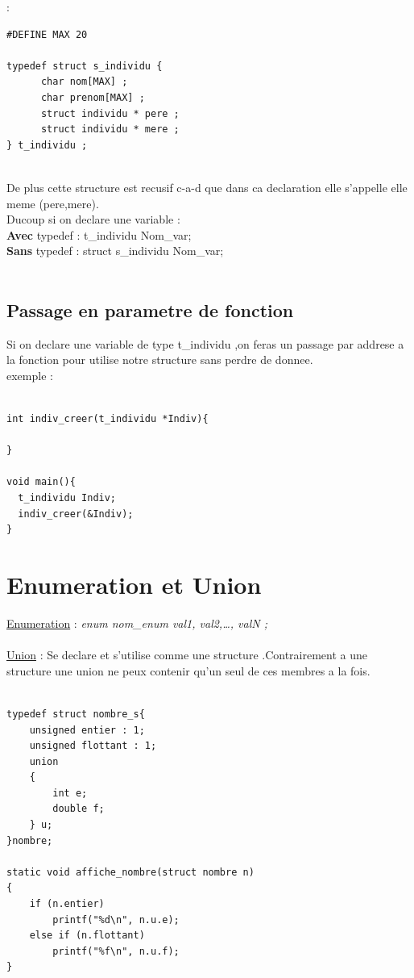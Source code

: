 \documentclass[a4paper,12pt,openany]{book}
\begin{document}
 : \\
\begin{verbatim}
#DEFINE MAX 20

typedef struct s_individu {
      char nom[MAX] ;
      char prenom[MAX] ;
      struct individu * pere ;
      struct individu * mere ;
} t_individu ; 
\end{verbatim}
\\
De plus cette structure est recusif c-a-d que dans ca declaration elle s'appelle elle meme (\*pere,\*mere).\\
Ducoup si on declare une variable :\\
\textbf{Avec} typedef : t\_individu Nom\_var;\\
\textbf{Sans} typedef : struct s\_individu Nom\_var;\\
\\

\subsection{Passage en parametre de fonction}

Si on declare une variable de type t\_individu ,on feras un passage par addrese a la fonction pour utilise notre structure sans perdre de donnee.\\
exemple :\\
\\
\begin{verbatim}
int indiv_creer(t_individu *Indiv){
  
}

void main(){
  t_individu Indiv;
  indiv_creer(&Indiv);
}
\end{verbatim}


\section{Enumeration et Union}

\underline{Enumeration} : \emph{enum nom\_enum { val1, val2,\ldots, valN };}\\
\\
\underline{Union} : Se declare et s'utilise comme une structure .Contrairement a une structure une union ne peux contenir qu'un seul de ces membres a la fois. \\
\\
\begin{verbatim}
typedef struct nombre_s{
    unsigned entier : 1;
    unsigned flottant : 1;
    union
    {
        int e;
        double f;
    } u;
}nombre;

static void affiche_nombre(struct nombre n)
{
    if (n.entier)
        printf("%d\n", n.u.e);
    else if (n.flottant)
        printf("%f\n", n.u.f);
}
\end{verbatim}
\end{document}
